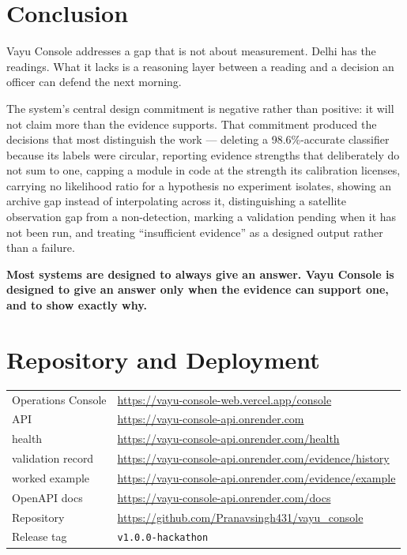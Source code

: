 \documentclass[11pt,a4paper]{article}
\newcommand{\keyclaim}[1]{%
  \par\vspace{0.7ex}\noindent
  \colorbox{vwash}{\parbox{\dimexpr\linewidth-2\fboxsep}{%
    \color{vblack}\textbf{#1}}}%
  \par\vspace{0.9ex}}
\newcommand{\code}[1]{\texttt{\small #1}}
\begin{document}
\section{Conclusion}

Vayu Console addresses a gap that is not about measurement. Delhi has the readings.
What it lacks is a reasoning layer between a reading and a decision an officer can
defend the next morning.

The system's central design commitment is negative rather than positive: it will not
claim more than the evidence supports. That commitment produced the decisions that
most distinguish the work --- deleting a 98.6\%-accurate classifier because its
labels were circular, reporting evidence strengths that deliberately do not sum to
one, capping a module in code at the strength its calibration licenses, carrying no
likelihood ratio for a hypothesis no experiment isolates, showing an archive gap
instead of interpolating across it, distinguishing a satellite observation gap from
a non-detection, marking a validation pending when it has not been run, and treating
``insufficient evidence'' as a designed output rather than a failure.

\keyclaim{Most systems are designed to always give an answer. Vayu Console is
designed to give an answer only when the evidence can support one, and to show
exactly why.}

\section{Repository and Deployment}

\begin{center}
\small
\begin{tabularx}{\linewidth}{@{}l X@{}}
\toprule
Operations Console & \url{https://vayu-console-web.vercel.app/console} \\
API & \url{https://vayu-console-api.onrender.com} \\
\quad health & \url{https://vayu-console-api.onrender.com/health} \\
\quad validation record & \url{https://vayu-console-api.onrender.com/evidence/history} \\
\quad worked example & \url{https://vayu-console-api.onrender.com/evidence/example} \\
\quad OpenAPI docs & \url{https://vayu-console-api.onrender.com/docs} \\
Repository & \url{https://github.com/Pranavsingh431/vayu_console} \\
Release tag & \code{v1.0.0-hackathon} \\
\bottomrule
\end{tabularx}
\end{center}
\end{document}
